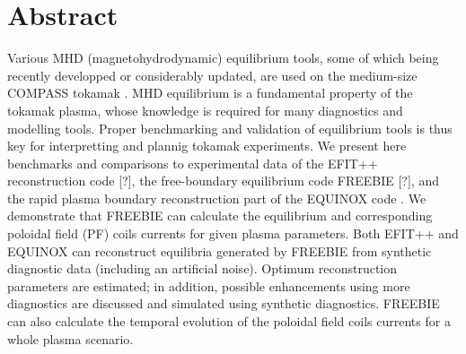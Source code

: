 \section{Abstract}

Various MHD (magnetohydrodynamic) equilibrium tools, some of which being recently developped or considerably updated, are used on the medium-size COMPASS tokamak \cite{P_nek_2006}. MHD equilibrium is a fundamental property of the tokamak plasma, whose knowledge is required for many diagnostics and modelling tools. Proper benchmarking and validation of equilibrium tools is thus key for interpretting and plannig tokamak experiments. We present here benchmarks and comparisons to experimental data of the EFIT++ reconstruction code [?], the free-boundary equilibrium code FREEBIE [?], and the rapid plasma boundary reconstruction part of the EQUINOX code \cite{doi:10.1016/j.jcp.2011.04.005}. We demonstrate that FREEBIE can calculate the equilibrium and corresponding poloidal field (PF) coils currents for given plasma parameters. Both EFIT++ and EQUINOX can reconstruct equilibria generated by FREEBIE from synthetic diagnostic data (including an artificial noise). Optimum reconstruction parameters are estimated; in addition, possible enhancements using more diagnostics are discussed and simulated using synthetic diagnostics. FREEBIE can also calculate the temporal evolution of the poloidal field coils currents for a whole plasma scenario.
